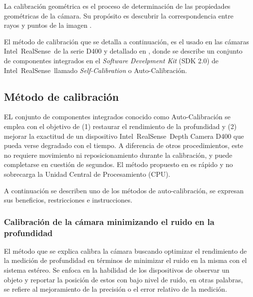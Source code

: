 \begin{definition}
	La calibración geométrica es el proceso de determinación de las propiedades geométricas de la cámara. Su propósito es descubrir la correspondencia entre rayos y puntos de la imagen \cite{kannala2008geometric}.
\end{definition}

El método de calibración que se detalla a continuación, es el usado en las cámaras Intel\textregistered~RealSense\texttrademark~de la serie D400 y detallado en \cite{grunnet2021intel}, donde se describe un conjunto de componentes integrados en el \textit{Software Develpment Kit} (SDK 2.0) de Intel\textregistered~RealSense\texttrademark~llamado \textit{Self-Calibration} o Auto-Calibración. 

\subsection{Método de calibración}

EL conjunto de componentes integrados conocido como Auto-Calibración se emplea con el objetivo de (1) restaurar el rendimiento de la profundidad y (2) mejorar la exactitud de un dispositivo Intel\textregistered~RealSense\texttrademark~Depth Camera D400 que pueda verse degradado con el tiempo. A diferencia de otros procedimientos, este no requiere movimiento ni reposicionamiento durante la calibración, y puede completarse en cuestión de segundos. El método propuesto en \cite{grunnet2021intel} es rápido y no sobrecarga la Unidad Central de Procesamiento (CPU).

A continuación se describen uno de los métodos de auto-calibración, se expresan sus beneficios, restricciones e instrucciones.

\subsubsection{Calibración de la cámara minimizando el ruido en la profundidad}

El método que se explica calibra la cámara buscando optimizar el rendimiento de la medición de profundidad en términos de minimizar el ruido en la misma con el sistema estéreo. Se enfoca en la habilidad de los dispositivos de observar un objeto y reportar la posición de estos con bajo nivel de ruido, en otras palabras, se refiere al mejoramiento de la precisión o el error relativo de la medición.

